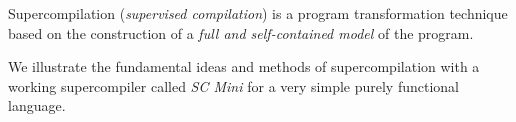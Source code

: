 %

\begin{introduction}
Supercompilation (\emph{supervised compilation}) is a program transformation technique based on
the construction of a \emph{full and self-contained model} of the program.

We illustrate the fundamental ideas and methods of supercompilation with a working
supercompiler called \emph{SC Mini} \cite{ScMiniAppendix,SCMiniUrl} for a very simple purely functional
language.
\end{introduction}

